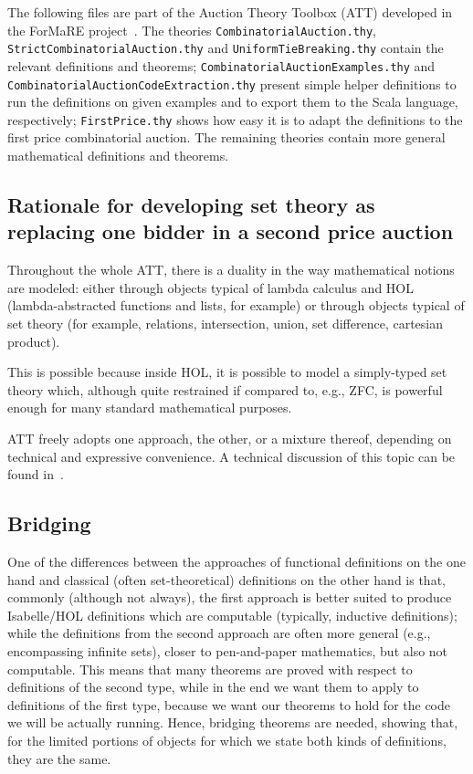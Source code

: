 \documentclass[11pt,a4paper]{article}
\begin{document}
  
The following files are part of the Auction Theory Toolbox (ATT)
developed in the ForMaRE project~\cite{formare}.  The theories
\texttt{CombinatorialAuction.thy},
\texttt{StrictCombinatorialAuction.thy} and
\texttt{UniformTieBreaking.thy} contain the relevant definitions and
theorems; \texttt{CombinatorialAuctionExamples.thy} and
\texttt{CombinatorialAuctionCodeExtraction.thy} present simple helper
definitions to run the definitions on given examples and to export
them to the Scala language, respectively; \texttt{FirstPrice.thy}
shows how easy it is to adapt the definitions to the first price
combinatorial auction.  The remaining theories contain more general
mathematical definitions and theorems.


\subsection{Rationale for developing set theory as replacing one bidder in a second price auction}

Throughout the whole ATT, there is a duality in the way mathematical
notions are modeled: either through objects typical of lambda calculus
and HOL (lambda-abstracted functions and lists, for example) or
through objects typical of set theory (for example, relations,
intersection, union, set difference, cartesian product).

This is possible because inside HOL, it is possible to model a
simply-typed set theory which, although quite restrained if compared
to, e.g., ZFC, is powerful enough for many standard mathematical
purposes.

ATT freely adopts one approach, the other, or a mixture thereof, depending on technical and
expressive convenience.
A technical discussion of this topic can be found in~\cite{cicm2014}.

\subsection{Bridging}

One of the differences between the approaches of functional
definitions on the one hand and classical (often set-theoretical)
definitions on the other hand is that, commonly (although not always),
the first approach is better suited to produce Isabelle/HOL
definitions which are computable (typically, inductive definitions);
while the definitions from the second approach are often more general
(e.g., encompassing infinite sets), closer to pen-and-paper
mathematics, but also not computable.  This means that many theorems
are proved with respect to definitions of the second type, while in
the end we want them to apply to definitions of the first type,
because we want our theorems to hold for the code we will be actually
running.  Hence, bridging theorems are needed, showing that, for the
limited portions of objects for which we state both kinds of
definitions, they are the same.
\end{document}
